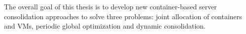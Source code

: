 


The overall goal of this thesis is to develop new container-based server consolidation approaches to solve three problems: joint allocation of containers  and VMs, periodic global optimization and dynamic consolidation. 
